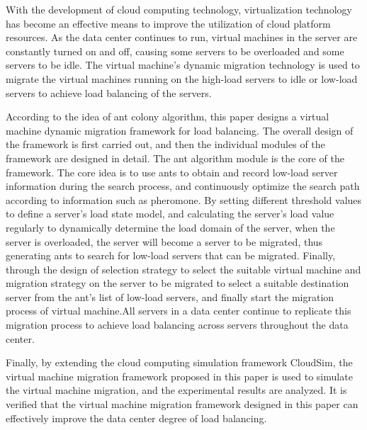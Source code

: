 \begin{enabstract}
With the development of cloud computing technology, virtualization technology has become an effective means to improve the utilization of cloud platform resources. As the data center continues to run, virtual machines in the server are constantly turned on and off, causing some servers to be overloaded and some servers to be idle. The virtual machine's dynamic migration technology is used to migrate the virtual machines running on the high-load servers to idle or low-load servers to achieve load balancing of the servers.

According to the idea of ​​ant colony algorithm, this paper designs a virtual machine dynamic migration framework for load balancing. The overall design of the framework is first carried out, and then the individual modules of the framework are designed in detail. The ant algorithm module is the core of the framework. The core idea is to use ants to obtain and record low-load server information during the search process, and continuously optimize the search path according to information such as pheromone. By setting different threshold values to define a server's load state model, and calculating the server's load value regularly to dynamically determine the load domain of the server, when the server is overloaded, the server will become a server to be migrated, thus generating ants to search for low-load servers that can be migrated. Finally, through the design of selection strategy to select the suitable virtual machine and migration strategy on the server to be migrated to select a suitable destination server from the ant's list of low-load servers, and finally start the migration process of virtual machine.All servers in a data center continue to replicate this migration process to achieve load balancing across servers throughout the data center.

Finally, by extending the cloud computing simulation framework CloudSim, the virtual machine migration framework proposed in this paper is used to simulate the virtual machine migration, and the experimental results are analyzed. It is verified that the virtual machine migration framework designed in this paper can effectively improve the data center degree of load balancing.

\end{enabstract}
